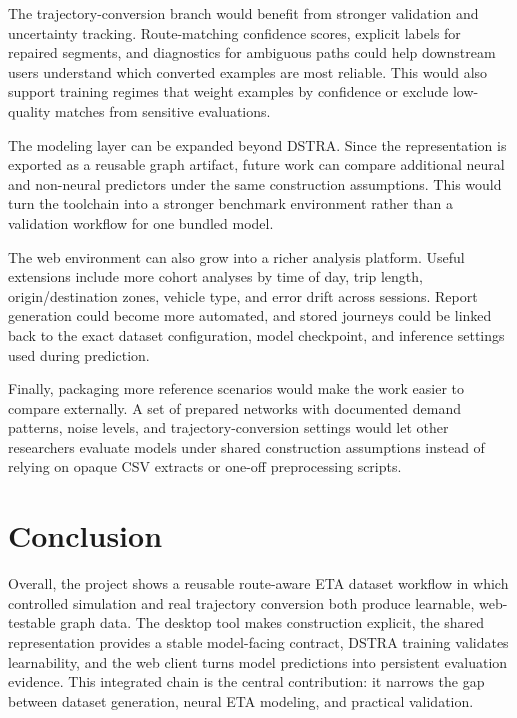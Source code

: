 The trajectory-conversion branch would benefit from stronger validation and uncertainty tracking. Route-matching confidence scores, explicit labels for repaired segments, and diagnostics for ambiguous paths could help downstream users understand which converted examples are most reliable. This would also support training regimes that weight examples by confidence or exclude low-quality matches from sensitive evaluations.

The modeling layer can be expanded beyond DSTRA. Since the representation is exported as a reusable graph artifact, future work can compare additional neural and non-neural predictors under the same construction assumptions. This would turn the toolchain into a stronger benchmark environment rather than a validation workflow for one bundled model.

The web environment can also grow into a richer analysis platform. Useful extensions include more cohort analyses by time of day, trip length, origin/destination zones, vehicle type, and error drift across sessions. Report generation could become more automated, and stored journeys could be linked back to the exact dataset configuration, model checkpoint, and inference settings used during prediction.

Finally, packaging more reference scenarios would make the work easier to compare externally. A set of prepared networks with documented demand patterns, noise levels, and trajectory-conversion settings would let other researchers evaluate models under shared construction assumptions instead of relying on opaque CSV extracts or one-off preprocessing scripts.

\section{Conclusion}
Overall, the project shows a reusable route-aware ETA dataset workflow in which controlled simulation and real trajectory conversion both produce learnable, web-testable graph data. The desktop tool makes construction explicit, the shared representation provides a stable model-facing contract, DSTRA training validates learnability, and the web client turns model predictions into persistent evaluation evidence. This integrated chain is the central contribution: it narrows the gap between dataset generation, neural ETA modeling, and practical validation.
